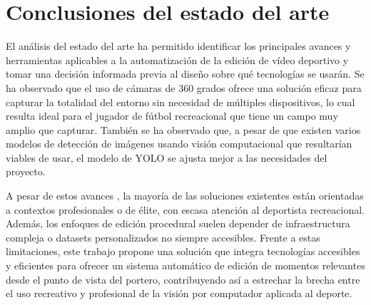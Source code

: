 \section[Conclusiones]{Conclusiones del estado del arte}

El análisis del estado del arte ha permitido identificar los principales avances y herramientas aplicables a la automatización de la edición de vídeo deportivo y tomar una decisión informada previa al diseño sobre qué tecnologías se usarán. Se ha observado que el uso de cámaras de 360 grados ofrece una solución eficaz para capturar la totalidad del entorno sin necesidad de múltiples dispositivos, lo cual resulta ideal para el jugador de fútbol recreacional que tiene un campo muy amplio que capturar. También se ha observado que, a pesar de que existen varios modelos de detección de imágenes usando visión computacional que resultarían viables de usar, el modelo de YOLO se ajusta mejor a las necesidades del proyecto.

A pesar de estos avances \cite{xiong2019less}, la mayoría de las soluciones existentes están orientadas a contextos profesionales o de élite, con escasa atención al deportista recreacional. Además, los enfoques de edición procedural suelen depender de infraestructura compleja o datasets personalizados no siempre accesibles. Frente a estas limitaciones, este trabajo propone una solución que integra tecnologías accesibles y eficientes para ofrecer un sistema automático de edición de momentos relevantes desde el punto de vista del portero, contribuyendo así a estrechar la brecha entre el uso recreativo y profesional de la visión por computador aplicada al deporte.
